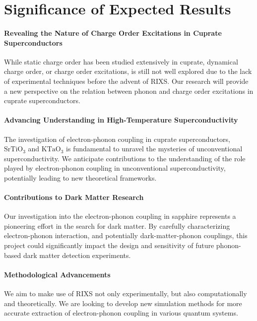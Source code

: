 \documentclass[11pt]{article}
\begin{document}
\section{Significance of Expected Results}
\paragraph{Revealing the Nature of Charge Order Excitations in Cuprate Superconductors} While static charge order has been studied extensively in cuprate, dynamical charge order, or charge order excitations, is still not well explored due to the lack of experimental techniques before the advent of RIXS\cite{li_multiorbital_2020}.  Our research will provide a new perspective on the relation between phonon and charge order excitations in cuprate superconductors.

\paragraph{Advancing Understanding in High-Temperature Superconductivity}
The investigation of electron-phonon coupling in cuprate superconductors, $\mathrm{SrTiO_{3}}$ and $\mathrm{KTaO_{3}}$ is fundamental to unravel the mysteries of unconventional superconductivity. 
We anticipate contributions to the understanding of the role played by electron-phonon coupling in unconventional superconductivity, potentially leading to new theoretical frameworks. 

\paragraph{Contributions to Dark Matter Research}
Our investigation into the electron-phonon coupling in sapphire represents a pioneering effort in the search for dark matter. By carefully characterizing electron-phonon interaction, and potentially dark-matter-phonon couplings, this project could significantly impact the design and sensitivity of future phonon-based dark matter detection experiments. 

\paragraph{Methodological Advancements}
We aim to make use of RIXS not only experimentally, but also computationally and theoretically. We are looking to  develop new simulation methods for more accurate extraction of electron-phonon coupling in various quantum systems. 



\newpage


\end{document}
